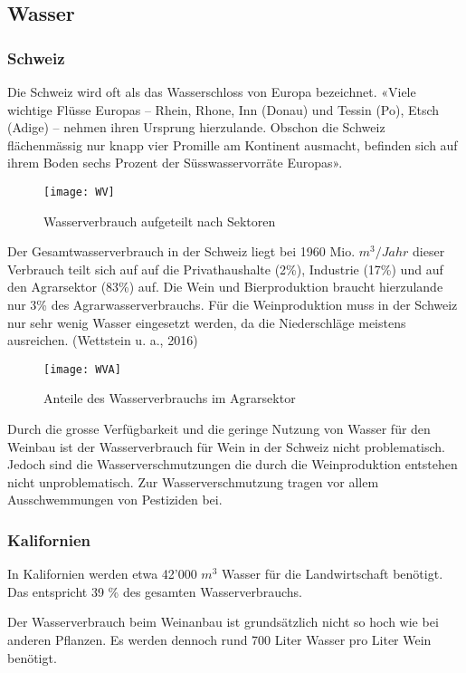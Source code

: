 \subsection{Wasser}

\subsubsection{Schweiz}
Die Schweiz wird oft als das Wasserschloss von Europa bezeichnet. «Viele wichtige Flüsse Europas – Rhein, Rhone, Inn (Donau) und Tessin (Po), Etsch (Adige) – nehmen ihren Ursprung hierzulande. Obschon die Schweiz flächenmässig nur knapp vier Promille am Kontinent ausmacht, befinden sich auf ihrem Boden sechs Prozent der Süsswasservorräte Europas».\cite{_weil}
\begin{figure}[H]
	\centering
	\texttt{[image: WV]}
	\caption{Wasserverbrauch aufgeteilt nach Sektoren}
\end{figure}
Der Gesamtwasserverbrauch in der Schweiz liegt bei 1960 Mio. $m^3/Jahr$ dieser Verbrauch teilt sich auf auf die Privathaushalte (2\%), Industrie (17\%) und auf den Agrarsektor (83\%) auf. Die Wein und Bierproduktion braucht hierzulande nur 3\% des Agrarwasserverbrauchs. Für die Weinproduktion muss in der Schweiz nur sehr wenig Wasser eingesetzt werden, da die Niederschläge meistens ausreichen. (Wettstein u. a., 2016)
\begin{figure}[H]
	\centering
	\texttt{[image: WVA]}
	\caption{Anteile des Wasserverbrauchs im       Agrarsektor}
\end{figure}

Durch die grosse Verfügbarkeit und die geringe Nutzung von Wasser für den Weinbau ist der Wasserverbrauch für Wein in der Schweiz nicht problematisch. Jedoch sind die Wasserverschmutzungen die durch die Weinproduktion entstehen nicht unproblematisch. Zur Wasserverschmutzung tragen vor allem Ausschwemmungen von Pestiziden bei.

\subsubsection{Kalifornien}
\label{sub:wasserverbrauch}

In Kalifornien werden etwa 42'000 $m^3$ Wasser für die Landwirtschaft benötigt. Das entspricht  39 \% des gesamten
Wasserverbrauchs. 

Der Wasserverbrauch beim Weinanbau ist grundsätzlich nicht so hoch wie bei anderen Pflanzen. Es
werden dennoch rund 700 Liter Wasser pro Liter Wein benötigt.
\cite{_sustainability} 

